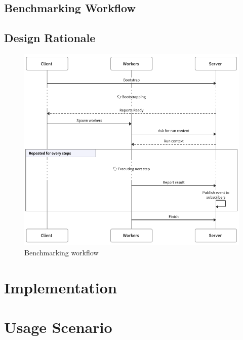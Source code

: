\subsection{Benchmarking Workflow}
\subsection{Design Rationale}



\begin{figure}
    \centering
    \includegraphics[width=\textwidth]{assets/pics/workflow-swimlane.png}
    \caption{Benchmarking workflow}
\end{figure}

\section{Implementation}
\section{Usage Scenario}
